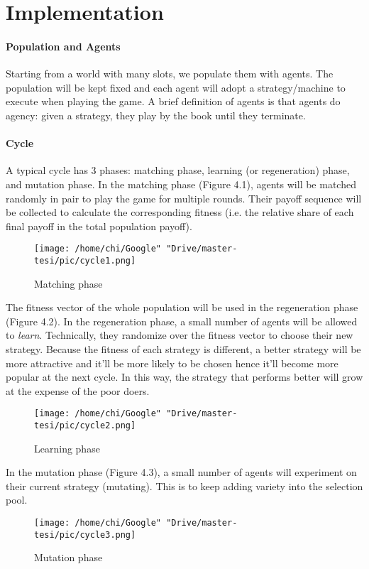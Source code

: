 \documentclass[12.5pt]{report}
\begin{document}
\section{Implementation}
\paragraph{Population and Agents}
Starting from a world with many slots, we populate them with agents. The population will be kept fixed and each agent will adopt a strategy/machine to execute when playing the game. A brief definition of agents is that agents do agency: given a strategy, they play by the book until they terminate.

\paragraph{Cycle}
A typical cycle has 3 phases: matching phase, learning (or regeneration) phase, and mutation phase. In the matching phase (Figure 4.1), agents will be matched randomly in pair to play the game for multiple rounds. Their payoff sequence will be collected to calculate the corresponding fitness (i.e. the relative share of each final payoff in the total population payoff). 
\begin{figure}[h!]
 \center
\texttt{[image: /home/chi/Google" "Drive/master-tesi/pic/cycle1.png]}
\caption{Matching phase}
\end{figure}
The fitness vector of the whole population will be used in the regeneration phase (Figure 4.2). In the regeneration phase, a small number of agents will be allowed to \emph{learn}. Technically, they randomize over the fitness vector to choose their new strategy. Because the fitness of each strategy is different, a better strategy will be more attractive and it'll be more likely to be chosen hence it'll become more popular at the next cycle. In this way, the strategy that performs better will grow at the expense of the poor doers. 
\begin{figure}[h!]
 \center
\texttt{[image: /home/chi/Google" "Drive/master-tesi/pic/cycle2.png]}
\caption{Learning phase}
\end{figure}
In the mutation phase (Figure 4.3), a small number of agents will experiment on their current strategy (mutating). This is to keep adding variety into the selection pool.\\

\begin{figure}[h!]
 \center
\texttt{[image: /home/chi/Google" "Drive/master-tesi/pic/cycle3.png]}
\caption{Mutation phase}
\end{figure}
\end{document}
